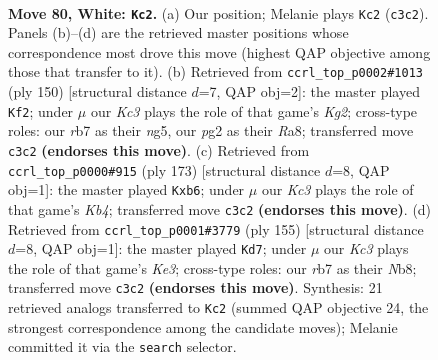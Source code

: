 \documentclass[11pt]{article}
\begin{document}
\clearpage

\begin{figure}[p]\centering
\begin{subfigure}{0.46\textwidth}\centering
\resizebox{\linewidth}{!}{%
\newchessgame
\chessboard[
  setfen={8/1r6/6k1/8/8/2K1p3/5pp1/8 w - - 0 80},
  showmover=false,
  pgfstyle=straightmove, color=movearrow, markmove={c3-c2}
]}
\caption{}
\end{subfigure}\hfill
\begin{subfigure}{0.46\textwidth}\centering
\resizebox{\linewidth}{!}{%
\newchessgame
\chessboard[
  setfen={R7/4k3/6p1/5pn1/8/8/6K1/8 w - - 0 76},
  showmover=false,
  pgfstyle=straightmove, color=movearrow, markmove={g2-f2}
]}
\caption{}
\end{subfigure}
\\[4pt]
\begin{subfigure}{0.46\textwidth}\centering
\resizebox{\linewidth}{!}{%
\newchessgame
\chessboard[
  setfen={8/2P3R1/1P6/1k6/8/3K1P2/8/8 b - - 0 87},
  showmover=false,
  pgfstyle=straightmove, color=movearrow, markmove={b5-b6}
]}
\caption{}
\end{subfigure}\hfill
\begin{subfigure}{0.46\textwidth}\centering
\resizebox{\linewidth}{!}{%
\newchessgame
\chessboard[
  setfen={1n6/8/1P2k3/2P5/8/5p2/N7/6K1 b - - 7 78},
  showmover=false,
  pgfstyle=straightmove, color=movearrow, markmove={e6-d7}
]}
\caption{}
\end{subfigure}
\caption{\textbf{Move 80, White: \texttt{Kc2}.} (a) Our position; Melanie plays \texttt{Kc2} (\texttt{c3c2}). Panels (b)--(d) are the retrieved master positions whose correspondence most drove this move (highest QAP objective among those that transfer to it). (b) Retrieved from \texttt{ccrl\_top\_p0002\#1013} (ply 150) [structural distance $d$=7, QAP obj=2]: the master played \texttt{Kf2}; under $\mu$ our \emph{Kc3} plays the role of that game's \emph{Kg2}; cross-type roles: our \emph{r}b7 as their \emph{n}g5, our \emph{p}g2 as their \emph{R}a8; transferred move \texttt{c3c2} \textbf{(endorses this move)}. (c) Retrieved from \texttt{ccrl\_top\_p0000\#915} (ply 173) [structural distance $d$=8, QAP obj=1]: the master played \texttt{Kxb6}; under $\mu$ our \emph{Kc3} plays the role of that game's \emph{Kb4}; transferred move \texttt{c3c2} \textbf{(endorses this move)}. (d) Retrieved from \texttt{ccrl\_top\_p0001\#3779} (ply 155) [structural distance $d$=8, QAP obj=1]: the master played \texttt{Kd7}; under $\mu$ our \emph{Kc3} plays the role of that game's \emph{Ke3}; cross-type roles: our \emph{r}b7 as their \emph{N}b8; transferred move \texttt{c3c2} \textbf{(endorses this move)}. Synthesis: 21 retrieved analogs transferred to \texttt{Kc2} (summed QAP objective 24, the strongest correspondence among the candidate moves); Melanie committed it via the \texttt{search} selector.}
\label{fig:thought-m158}
\end{figure}
\end{document}
